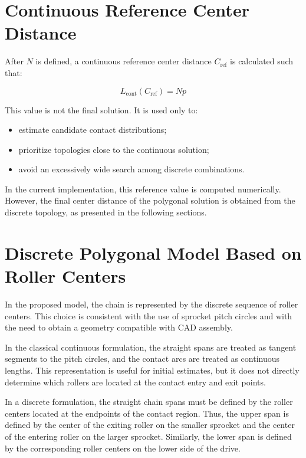 \documentclass[12pt,a4paper]{article}
\begin{document}
\section{Continuous Reference Center Distance}

After $N$ is defined, a continuous reference center distance $C_{\text{ref}}$ is calculated such that:

\begin{equation}
L_{\text{cont}}(C_{\text{ref}})=Np
\end{equation}

This value is not the final solution. It is used only to:

\begin{itemize}
    \item estimate candidate contact distributions;
    \item prioritize topologies close to the continuous solution;
    \item avoid an excessively wide search among discrete combinations.
\end{itemize}

In the current implementation, this reference value is computed numerically. However, the final center distance of the polygonal solution is obtained from the discrete topology, as presented in the following sections.

\section{Discrete Polygonal Model Based on Roller Centers}

In the proposed model, the chain is represented by the discrete sequence of roller centers. This choice is consistent with the use of sprocket pitch circles and with the need to obtain a geometry compatible with CAD assembly.

In the classical continuous formulation, the straight spans are treated as tangent segments to the pitch circles, and the contact arcs are treated as continuous lengths. This representation is useful for initial estimates, but it does not directly determine which rollers are located at the contact entry and exit points.

In a discrete formulation, the straight chain spans must be defined by the roller centers located at the endpoints of the contact region. Thus, the upper span is defined by the center of the exiting roller on the smaller sprocket and the center of the entering roller on the larger sprocket. Similarly, the lower span is defined by the corresponding roller centers on the lower side of the drive.
\end{document}
